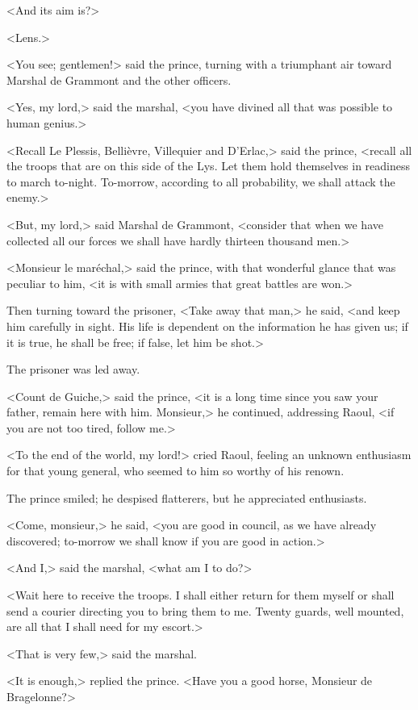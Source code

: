 <And its aim is?>

<Lens.>

<You see; gentlemen!> said the prince, turning with a triumphant air toward Marshal de Grammont and the other officers.

<Yes, my lord,> said the marshal, <you have divined all that was possible to human genius.>

<Recall Le Plessis, Bellièvre, Villequier and D'Erlac,> said the prince, <recall all the troops that are on this side of the Lys. Let them hold themselves in readiness to march to-night. To-morrow, according to all probability, we shall attack the enemy.>

<But, my lord,> said Marshal de Grammont, <consider that when we have collected all our forces we shall have hardly thirteen thousand men.>

<Monsieur le maréchal,> said the prince, with that wonderful glance that was peculiar to him, <it is with small armies that great battles are won.>

Then turning toward the prisoner, <Take away that man,> he said, <and keep him carefully in sight. His life is dependent on the information he has given us; if it is true, he shall be free; if false, let him be shot.>

The prisoner was led away.

<Count de Guiche,> said the prince, <it is a long time since you saw your father, remain here with him. Monsieur,> he continued, addressing Raoul, <if you are not too tired, follow me.>

<To the end of the world, my lord!> cried Raoul, feeling an unknown enthusiasm for that young general, who seemed to him so worthy of his renown.

The prince smiled; he despised flatterers, but he appreciated enthusiasts.

<Come, monsieur,> he said, <you are good in council, as we have already discovered; to-morrow we shall know if you are good in action.>

<And I,> said the marshal, <what am I to do?>

<Wait here to receive the troops. I shall either return for them myself or shall send a courier directing you to bring them to me. Twenty guards, well mounted, are all that I shall need for my escort.>

<That is very few,> said the marshal.

<It is enough,> replied the prince. <Have you a good horse, Monsieur de Bragelonne?>

